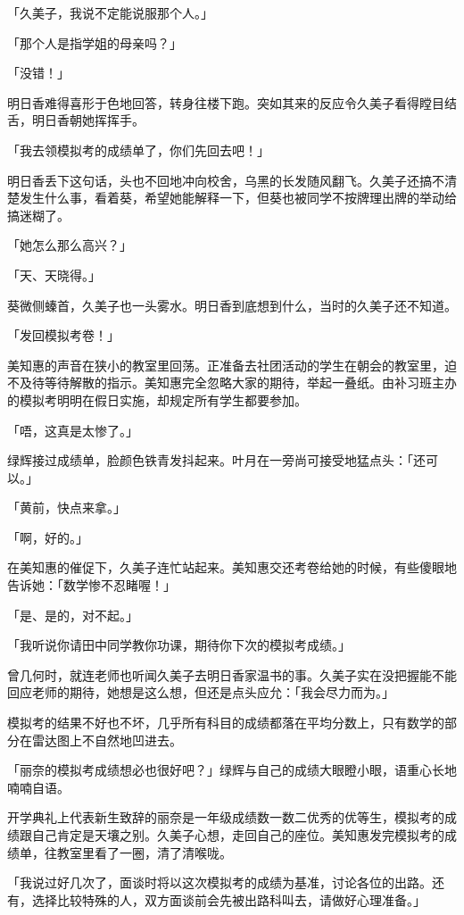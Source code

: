 \documentclass[UTF8]{ctexart}
\begin{document}
    「久美子，我说不定能说服那个人。」 

    「那个人是指学姐的母亲吗？」 

    「没错！」 

    明日香难得喜形于色地回答，转身往楼下跑。突如其来的反应令久美子看得瞠目结舌，明日香朝她挥挥手。 

    「我去领模拟考的成绩单了，你们先回去吧！」 

    明日香丢下这句话，头也不回地冲向校舍，乌黑的长发随风翻飞。久美子还搞不清楚发生什么事，看着葵，希望她能解释一下，但葵也被同学不按牌理出牌的举动给搞迷糊了。 

    「她怎么那么高兴？」 

    「天、天晓得。」 

    葵微侧螓首，久美子也一头雾水。明日香到底想到什么，当时的久美子还不知道。 

    「发回模拟考卷！」 

    美知惠的声音在狭小的教室里回荡。正准备去社团活动的学生在朝会的教室里，迫不及待等待解散的指示。美知惠完全忽略大家的期待，举起一叠纸。由补习班主办的模拟考明明在假日实施，却规定所有学生都要参加。 

    「唔，这真是太惨了。」 

    绿辉接过成绩单，脸颜色铁青发抖起来。叶月在一旁尚可接受地猛点头：「还可以。」 

    「黄前，快点来拿。」 

    「啊，好的。」 

    在美知惠的催促下，久美子连忙站起来。美知惠交还考卷给她的时候，有些傻眼地告诉她：「数学惨不忍睹喔！」 

    「是、是的，对不起。」 

    「我听说你请田中同学教你功课，期待你下次的模拟考成绩。」 

    曾几何时，就连老师也听闻久美子去明日香家温书的事。久美子实在没把握能不能回应老师的期待，她想是这么想，但还是点头应允：「我会尽力而为。」 

    模拟考的结果不好也不坏，几乎所有科目的成绩都落在平均分数上，只有数学的部分在雷达图上不自然地凹进去。 

    「丽奈的模拟考成绩想必也很好吧？」绿辉与自己的成绩大眼瞪小眼，语重心长地喃喃自语。 

    开学典礼上代表新生致辞的丽奈是一年级成绩数一数二优秀的优等生，模拟考的成绩跟自己肯定是天壤之别。久美子心想，走回自己的座位。美知惠发完模拟考的成绩单，往教室里看了一圈，清了清喉咙。 

    「我说过好几次了，面谈时将以这次模拟考的成绩为基准，讨论各位的出路。还有，选择比较特殊的人，双方面谈前会先被出路科叫去，请做好心理准备。」 
\end{document}
